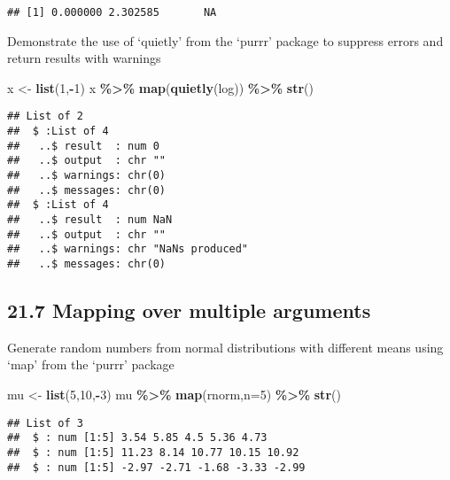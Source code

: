 \documentclass[
]{article}
\newenvironment{Shaded}{\begin{snugshade}}{\end{snugshade}}
\newcommand{\AttributeTok}[1]{\textcolor[rgb]{0.13,0.29,0.53}{#1}}
\newcommand{\DecValTok}[1]{\textcolor[rgb]{0.00,0.00,0.81}{#1}}
\newcommand{\FunctionTok}[1]{\textcolor[rgb]{0.13,0.29,0.53}{\textbf{#1}}}
\newcommand{\NormalTok}[1]{#1}
\newcommand{\OtherTok}[1]{\textcolor[rgb]{0.56,0.35,0.01}{#1}}
\newcommand{\SpecialCharTok}[1]{\textcolor[rgb]{0.81,0.36,0.00}{\textbf{#1}}}
\begin{document}
\begin{verbatim}
## [1] 0.000000 2.302585       NA
\end{verbatim}

Demonstrate the use of `quietly' from the `purrr' package to suppress
errors and return results with warnings

\begin{Shaded}
\begin{Highlighting}[]
\NormalTok{x }\OtherTok{\textless{}{-}} \FunctionTok{list}\NormalTok{(}\DecValTok{1}\NormalTok{,}\SpecialCharTok{{-}}\DecValTok{1}\NormalTok{)}
\NormalTok{x }\SpecialCharTok{\%\textgreater{}\%} \FunctionTok{map}\NormalTok{(}\FunctionTok{quietly}\NormalTok{(log)) }\SpecialCharTok{\%\textgreater{}\%} \FunctionTok{str}\NormalTok{()}
\end{Highlighting}
\end{Shaded}

\begin{verbatim}
## List of 2
##  $ :List of 4
##   ..$ result  : num 0
##   ..$ output  : chr ""
##   ..$ warnings: chr(0) 
##   ..$ messages: chr(0) 
##  $ :List of 4
##   ..$ result  : num NaN
##   ..$ output  : chr ""
##   ..$ warnings: chr "NaNs produced"
##   ..$ messages: chr(0)
\end{verbatim}

\hypertarget{mapping-over-multiple-arguments}{%
\subsection{21.7 Mapping over multiple
arguments}\label{mapping-over-multiple-arguments}}

Generate random numbers from normal distributions with different means
using `map' from the `purrr' package

\begin{Shaded}
\begin{Highlighting}[]
\NormalTok{mu }\OtherTok{\textless{}{-}} \FunctionTok{list}\NormalTok{(}\DecValTok{5}\NormalTok{,}\DecValTok{10}\NormalTok{,}\SpecialCharTok{{-}}\DecValTok{3}\NormalTok{)}
\NormalTok{mu }\SpecialCharTok{\%\textgreater{}\%} 
  \FunctionTok{map}\NormalTok{(rnorm,}\AttributeTok{n=}\DecValTok{5}\NormalTok{) }\SpecialCharTok{\%\textgreater{}\%} 
  \FunctionTok{str}\NormalTok{()}
\end{Highlighting}
\end{Shaded}

\begin{verbatim}
## List of 3
##  $ : num [1:5] 3.54 5.85 4.5 5.36 4.73
##  $ : num [1:5] 11.23 8.14 10.77 10.15 10.92
##  $ : num [1:5] -2.97 -2.71 -1.68 -3.33 -2.99
\end{verbatim}
\end{document}
